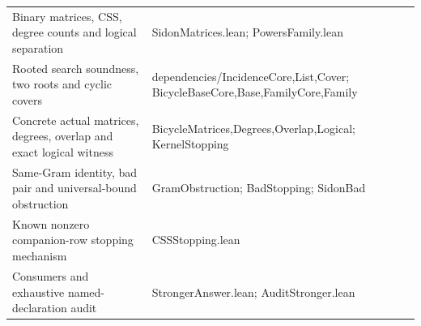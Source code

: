 \begin{longtable}{@{}>{\raggedright\arraybackslash}p{.465\linewidth}>{\raggedright\arraybackslash}p{.465\linewidth}@{}}
Binary matrices, CSS, degree counts and logical separation & SidonMatrices.lean; PowersFamily.lean\\[4pt]
Rooted search soundness, two roots and cyclic covers & dependencies/IncidenceCore,List,Cover; BicycleBaseCore,Base,FamilyCore,Family\\[4pt]
Concrete actual matrices, degrees, overlap and exact logical witness & BicycleMatrices,Degrees,Overlap,Logical; KernelStopping\\[4pt]
Same-Gram identity, bad pair and universal-bound obstruction & GramObstruction; BadStopping; SidonBad\\[4pt]
Known nonzero companion-row stopping mechanism & CSSStopping.lean\\[4pt]
Consumers and exhaustive named-declaration audit & StrongerAnswer.lean; AuditStronger.lean\\[4pt]
\bottomrule\end{longtable}
